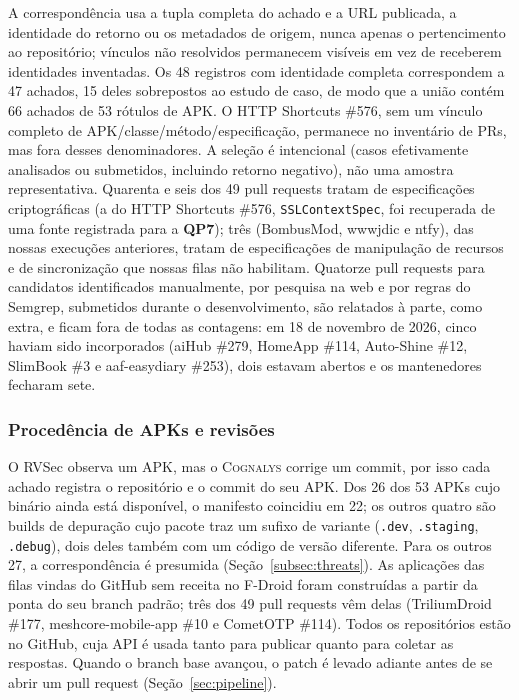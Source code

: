 \documentclass[conference]{IEEEtran}
\newcommand{\system}{\textsc{Cognalys}}
\newcommand{\researchq}[1]{\textbf{QP#1}}
\begin{document}
A correspondência usa a tupla completa do achado e a URL publicada, a identidade do retorno
ou os metadados de origem, nunca apenas o pertencimento ao repositório; vínculos não resolvidos permanecem
visíveis em vez de receberem identidades inventadas. Os 48 registros com
identidade completa correspondem a 47 achados, 15 deles sobrepostos ao estudo de caso,
de modo que a união contém 66 achados de 53 rótulos de APK. O HTTP Shortcuts \#576,
sem um vínculo completo de APK/classe/método/especificação, permanece no inventário
de PRs, mas fora desses denominadores. A seleção é intencional (casos
efetivamente analisados ou submetidos, incluindo retorno negativo), não uma
amostra representativa. Quarenta e seis dos 49 pull requests tratam de
especificações criptográficas (a do HTTP Shortcuts \#576, \texttt{SSLContextSpec},
foi recuperada de uma fonte registrada para a \researchq{7}); três (BombusMod,
wwwjdic e ntfy), das nossas execuções anteriores, tratam de especificações de
manipulação de recursos e de sincronização que nossas filas não habilitam. Quatorze pull requests para candidatos identificados
manualmente, por pesquisa na web e por regras do Semgrep, submetidos durante o
desenvolvimento, são relatados à parte, como extra, e ficam fora de todas as contagens: em
18 de novembro de 2026, cinco haviam sido incorporados (aiHub \#279, HomeApp \#114,
Auto-Shine \#12, SlimBook \#3 e aaf-easydiary \#253), dois estavam abertos e
os mantenedores fecharam sete.

\subsubsection{Procedência de APKs e revisões}

O RVSec observa um APK, mas o \system{} corrige um commit, por isso cada achado
registra o repositório e o commit do seu APK. Dos 26 dos 53 APKs cujo
binário ainda está disponível, o manifesto coincidiu em 22; os outros quatro são
builds de depuração cujo pacote traz um sufixo de variante (\texttt{.dev},
\texttt{.staging}, \texttt{.debug}), dois deles também com um código de versão diferente.
Para os outros 27, a correspondência é presumida
(Seção~\ref{subsec:threats}). As aplicações das filas vindas do GitHub sem
receita no F-Droid foram construídas a partir da ponta do seu branch padrão;
três dos 49 pull requests vêm delas (TriliumDroid \#177, meshcore-mobile-app
\#10 e CometOTP \#114). Todos os repositórios estão no GitHub, cuja API é usada
tanto para publicar quanto para coletar as respostas. Quando o branch base avançou, o
patch é levado adiante antes de se abrir um pull request
(Seção~\ref{sec:pipeline}).
\end{document}
